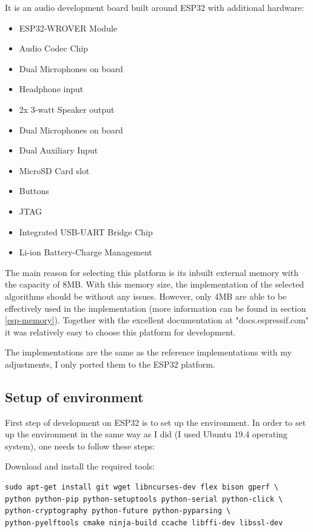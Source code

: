 \documentclass[thesis=M,english]{FITthesis}[2019/12/23]
\begin{document}
It is an audio development board built around ESP32 with additional hardware:
\begin{itemize}
\item	ESP32-WROVER Module
\item	Audio Codec Chip
\item	Dual Microphones on board
\item	Headphone input
\item	2x 3-watt Speaker output
\item	Dual Microphones on board
\item	Dual Auxiliary Input
\item	MicroSD Card slot
\item	Buttons
\item	JTAG
\item	Integrated USB-UART Bridge Chip
\item	Li-ion Battery-Charge Management
\end{itemize}
The main reason for selecting this platform is its inbuilt external memory with the capacity of 8MB. With this memory size, the implementation of the selected algorithms should be without any issues. However, only 4MB are able to be effectively used in the implementation (more information can be found in section \ref{esp-memory}). Together with the excellent documentation at "docs.espressif.com" it was relatively easy to choose this platform for development.

\bigskip
\noindent
The implementations are the same as the reference implementations with my adjustments, I only ported them to the ESP32 platform.

\subsection{Setup of environment}
First step of development on ESP32 is to set up the environment. In order to set up the environment in the same way as I did (I used Ubuntu 19.4 operating system), one needs to follow these steps:

\bigskip
\noindent
Download and install the required tools:
\begin{lstlisting}[frame=single]
sudo apt-get install git wget libncurses-dev flex bison gperf \
python python-pip python-setuptools python-serial python-click \
python-cryptography python-future python-pyparsing \
python-pyelftools cmake ninja-build ccache libffi-dev libssl-dev
\end{lstlisting}
\end{document}
